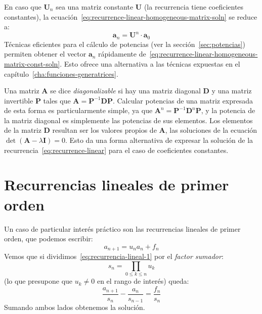   En caso que \(\boldsymbol{U}_n\) sea una matriz constante \(\boldsymbol{U}\)
  (la recurrencia tiene coeficientes constantes),
  la ecuación~\eqref{eq:recurrence-linear-homogeneous-matrix-soln}
  se reduce a:
  \begin{equation}
    \label{eq:recurrence-linear-homogeneous-matrix-const-soln}
    \boldsymbol{a}_n
      = \boldsymbol{U}^n \cdot \boldsymbol{a}_0
  \end{equation}
  Técnicas eficientes para el cálculo de potencias
  (ver la sección~\ref{sec:potencias})%
  permiten obtener el vector \(\boldsymbol{a}_n\)
  rápidamente de~\eqref{eq:recurrence-linear-homogeneous-matrix-const-soln}.
  Esto ofrece una alternativa a las técnicas expuestas
  en el capítulo~\ref{cha:funciones-generatrices}.%

  Una matriz \(\boldsymbol{A}\) se dice \emph{diagonalizable}%
  si hay una matriz diagonal \(\boldsymbol{D}\)%
  y una matriz invertible \(\boldsymbol{P}\)%
  tales que
    \(\boldsymbol{A} = \boldsymbol{P}^{-1} \boldsymbol{D} \boldsymbol{P}\).
  Calcular potencias de una matriz expresada de esta forma
  es particularmente simple,
  ya que
    \(\boldsymbol{A}^n = \boldsymbol{P}^{-1} \boldsymbol{D}^n \boldsymbol{P}\),
  y la potencia de la matriz diagonal
  es simplemente las potencias de sus elementos.
  Los elementos de la matriz \(\boldsymbol{D}\)
  resultan ser los valores propios de \(\boldsymbol{A}\),%
  las soluciones de la ecuación
    \(\det(\boldsymbol{A} - \lambda \boldsymbol{I}) = 0\).
  Esto da una forma alternativa
  de expresar la solución de la recurrencia~\eqref{eq:recurrence-linear}
  para el caso de coeficientes constantes.

\section{Recurrencias lineales de primer orden}
\label{sec:rec-lineal-1er}

  Un caso de particular interés práctico son las recurrencias lineales
  de primer orden,%
  que podemos escribir:
  \begin{equation}
    \label{eq:recurrencia-lineal-1}
    a_{n + 1}
      = u_n a_n + f_n
  \end{equation}
  Vemos que si dividimos~\eqref{eq:recurrencia-lineal-1}
  por el \emph{factor sumador}:%
  \begin{equation}
    \label{eq:recurrencia-lineal-2}
    s_n
      = \prod_{0 \le k \le n} u_k
  \end{equation}
  (lo que presupone que \(u_k \ne 0\) en el rango de interés)
  queda:
  \begin{equation*}
    \frac{a_{n + 1}}{s_n} - \frac{a_n}{s_{n - 1}}
      = \frac{f_n}{s_n}
  \end{equation*}
  Sumando ambos lados obtenemos la solución.

